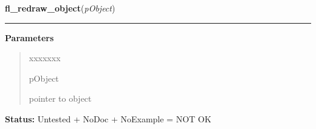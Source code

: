 \hspace{.8\funcindent}\begin{boxedminipage}{\funcwidth}

    \raggedright \textbf{fl\_redraw\_object}(\textit{pObject})

    \vspace{-1.5ex}

    \rule{\textwidth}{0.5\fboxrule}
\setlength{\parskip}{2ex}
\setlength{\parskip}{1ex}
      \textbf{Parameters}
      \vspace{-1ex}

      \begin{quote}
        \begin{Ventry}{xxxxxxx}

          \item[pObject]

          pointer to object

        \end{Ventry}

      \end{quote}

\textbf{Status:} Untested + NoDoc + NoExample = NOT OK



    \end{boxedminipage}

    \label{xformslib:library:fl_scale_object}

    \vspace{0.5ex}

